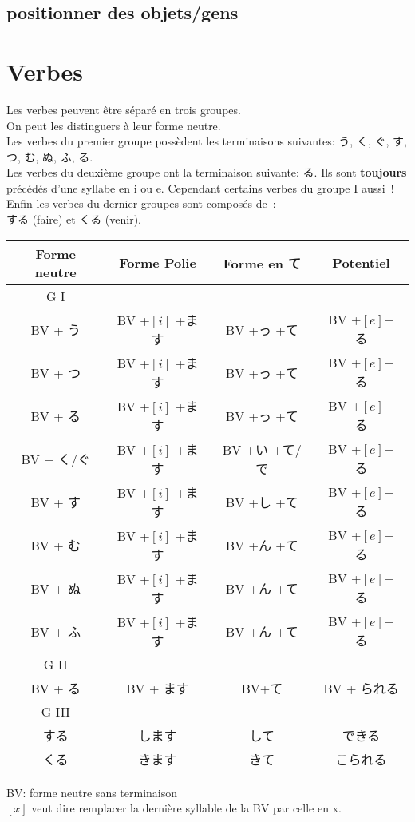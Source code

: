 \documentclass{article}
\begin{document}
    \subsection{positionner des objets/gens}


\section{Verbes}
\begin{CJK}{UTF8}{min}
    Les verbes peuvent être séparé en trois groupes.\\
    On peut les distinguers à leur forme neutre.\\
    Les verbes du premier groupe possèdent les terminaisons suivantes:
    う, く, ぐ, す, つ, む, ぬ, ふ, る.\\
    Les verbes du deuxième groupe ont la terminaison suivante:
    る. Ils sont \textbf{toujours} précédés d'une syllabe en i ou e. Cependant certains verbes du groupe I aussi~!\\
    Enfin les verbes du dernier groupes sont composés de~:\\
    する (faire) et くる (venir).\\
\begin{center}
\begin{tabular} {|c|c|c|c|}
    \hline
    Forme neutre & Forme Polie & Forme en て & Potentiel \\
    \hline
    G I& &&\\
    BV + う      & BV +$[i]$ +ます &BV +っ +て    &BV +$[e]$+ る\\ 
    BV + つ      & BV +$[i]$ +ます &BV +っ +て    &BV +$[e]$+ る\\ 
    BV + る      & BV +$[i]$ +ます &BV +っ +て    &BV +$[e]$+ る\\
    
    BV + く/ぐ   & BV +$[i]$ +ます &BV +い +て/で &BV +$[e]$+ る\\ 
    
    BV + す      & BV +$[i]$ +ます &BV +し +て    &BV +$[e]$+ る\\ 

    BV + む      & BV +$[i]$ +ます &BV +ん +て    &BV +$[e]$+ る\\ 
    BV + ぬ      & BV +$[i]$ +ます &BV +ん +て    &BV +$[e]$+ る\\ 
    BV + ふ      & BV +$[i]$ +ます &BV +ん +て    &BV +$[e]$+ る\\ 
    \hline
    G II&&&\\
    BV + る & BV + ます & BV+て & BV + られる\\
    \hline
    G III&&&\\
    する &します & して & できる\\
    くる & きます & きて  & こられる\\
    \hline
\end{tabular}
\end{center}
BV: forme neutre sans terminaison\\
$[x]$ veut dire remplacer la dernière syllable de la BV par celle en x.\\


\end{CJK}
\end{document}
